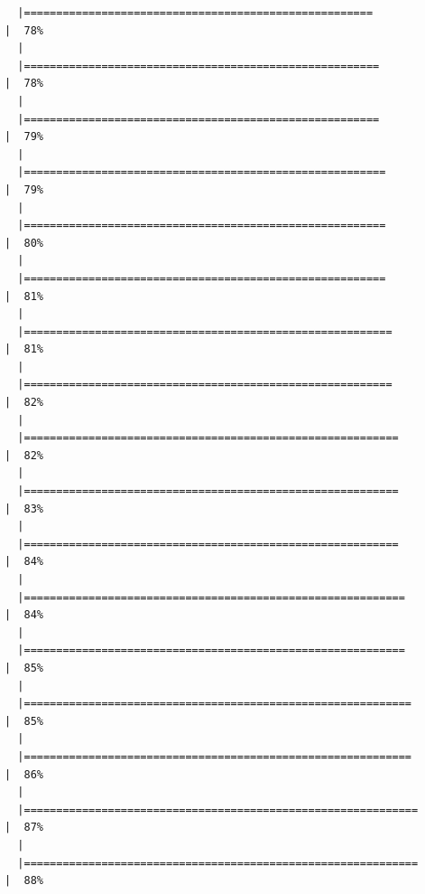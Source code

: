 \documentclass[
  letterpaper,
  DIV=11,
  numbers=noendperiod]{scrreprt}
\begin{document}
\begin{verbatim}
  |======================================================                |  78%
  |                                                                            
  |=======================================================               |  78%
  |                                                                            
  |=======================================================               |  79%
  |                                                                            
  |========================================================              |  79%
  |                                                                            
  |========================================================              |  80%
  |                                                                            
  |========================================================              |  81%
  |                                                                            
  |=========================================================             |  81%
  |                                                                            
  |=========================================================             |  82%
  |                                                                            
  |==========================================================            |  82%
  |                                                                            
  |==========================================================            |  83%
  |                                                                            
  |==========================================================            |  84%
  |                                                                            
  |===========================================================           |  84%
  |                                                                            
  |===========================================================           |  85%
  |                                                                            
  |============================================================          |  85%
  |                                                                            
  |============================================================          |  86%
  |                                                                            
  |=============================================================         |  87%
  |                                                                            
  |=============================================================         |  88%

\end{verbatim}
\end{document}
